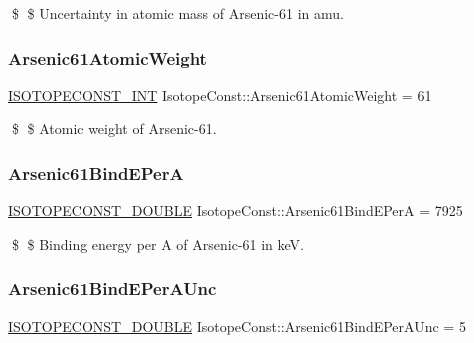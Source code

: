 \$ \$ Uncertainty in atomic mass of Arsenic-\/61 in amu. \mbox{\label{group___isotope_const-_arsenic-_as61_ga7b50f91c662995061f94e31ae10f252b}} 
\subsubsection{\texorpdfstring{Arsenic61\+Atomic\+Weight}{Arsenic61AtomicWeight}}
{\footnotesize\ttfamily \mbox{\hyperlink{group___isotope_const-_macros_ga5f18360b3e99483a35c32d789e62621c}{I\+S\+O\+T\+O\+P\+E\+C\+O\+N\+S\+T\+\_\+\+I\+NT}} Isotope\+Const\+::\+Arsenic61\+Atomic\+Weight = 61}

\$ \$ Atomic weight of Arsenic-\/61. \mbox{\label{group___isotope_const-_arsenic-_as61_ga25b67f39558ebf83edc7e64022c7b0fc}} 
\subsubsection{\texorpdfstring{Arsenic61\+Bind\+E\+PerA}{Arsenic61BindEPerA}}
{\footnotesize\ttfamily \mbox{\hyperlink{group___isotope_const-_macros_ga8f45a7272ce02c0b4c65c44636ed719a}{I\+S\+O\+T\+O\+P\+E\+C\+O\+N\+S\+T\+\_\+\+D\+O\+U\+B\+LE}} Isotope\+Const\+::\+Arsenic61\+Bind\+E\+PerA = 7925}

\$ \$ Binding energy per A of Arsenic-\/61 in keV. \mbox{\label{group___isotope_const-_arsenic-_as61_ga50b917b42e21139ddbbfe146dde6beb5}} 
\subsubsection{\texorpdfstring{Arsenic61\+Bind\+E\+Per\+A\+Unc}{Arsenic61BindEPerAUnc}}
{\footnotesize\ttfamily \mbox{\hyperlink{group___isotope_const-_macros_ga8f45a7272ce02c0b4c65c44636ed719a}{I\+S\+O\+T\+O\+P\+E\+C\+O\+N\+S\+T\+\_\+\+D\+O\+U\+B\+LE}} Isotope\+Const\+::\+Arsenic61\+Bind\+E\+Per\+A\+Unc = 5}

